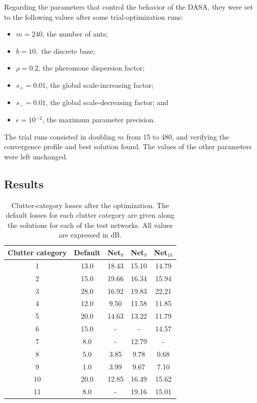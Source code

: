 Regarding the parameters that control the behavior of the DASA, they
were set to the following values after some trial-optimization runs:
\begin{itemize}
\item $m=240$, the number of ants;
\item $b=10,$ the discrete base;
\item $\rho=0.2$, the pheromone dispersion factor;
\item $s_{+}=0.01$, the global scale-increasing factor;
\item $s_{-}=0.01$, the global scale-decreasing factor; and 
\item $\epsilon=10{}^{-2}$, the maximum parameter precision.
\end{itemize}
The trial runs consisted in doubling $m$ from 15 to 480, and verifying
the convergence profile and best solution found. The values of the
other parameters were left unchanged.


\subsection{Results}

\begin{table}
\centering

\caption{Clutter-category losses after the optimization. The default losses
for each clutter category are given along the solutions for each of
the test networks. All values are expressed in dB. \label{tab:05-Clutter_optimization_solutions}}


{\small{}}%
\begin{tabular}{ccccc}
\hline 
{\small{Clutter category}} & {\small{Default}} & {\small{Net$_{8}$}} & {\small{Net$_{9}$}} & {\small{Net$_{10}$}}\tabularnewline
\hline 
{\small{1}} & {\small{13.0}} & {\small{18.43}} & {\small{15.10}} & {\small{14.79}}\tabularnewline
{\small{2}} & {\small{15.0}} & {\small{19.66}} & {\small{16.34}} & {\small{15.94}}\tabularnewline
{\small{3}} & {\small{28.0}} & {\small{16.92}} & {\small{19.83}} & {\small{22.21}}\tabularnewline
{\small{4}} & {\small{12.0}} & {\small{9.50}} & {\small{11.58}} & {\small{11.85}}\tabularnewline
{\small{5}} & {\small{20.0}} & {\small{14.63}} & {\small{13.22}} & {\small{11.79}}\tabularnewline
{\small{6}} & {\small{15.0}} & {\small{-}} & {\small{-}} & {\small{14.57}}\tabularnewline
{\small{7}} & {\small{8.0}} & {\small{-}} & {\small{12.79}} & {\small{-}}\tabularnewline
{\small{8}} & {\small{5.0}} & {\small{3.85}} & {\small{9.78}} & {\small{0.68}}\tabularnewline
{\small{9}} & {\small{1.0}} & {\small{3.99}} & {\small{9.67}} & {\small{7.10}}\tabularnewline
{\small{10}} & {\small{20.0}} & {\small{12.85}} & {\small{16.49}} & {\small{15.62}}\tabularnewline
{\small{11 }} & {\small{8.0}} & {\small{-}} & {\small{19.16}} & {\small{15.01}}\tabularnewline
\hline 
\end{tabular}
\end{table}



